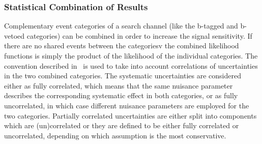 \subsubsection{Statistical Combination of Results}
Complementary event categories of a search channel (like the b-tagged and b-vetoed categories) 
can be combined in order to increase the signal sensitivity.
If there are no shared events between the categoriesv the combined likelihood functions is simply the product
of the likelihood of the individual categories. The  convention described in~\cite{lhclimits} is used
to take into account correlations of uncertainties in the two combined categories.
The systematic uncertainties are considered either as fully correlated, which means that the same nuisance parameter
describes the corresponding  systematic effect in both categories,  or as fully uncorrelated, in which case different nuisance parameters are
employed for the two categories. Partially correlated uncertainties are either split into components which are 
(un)correlated or they are defined  to be either fully correlated or uncorrelated, depending on which assumption is the most conservative.



